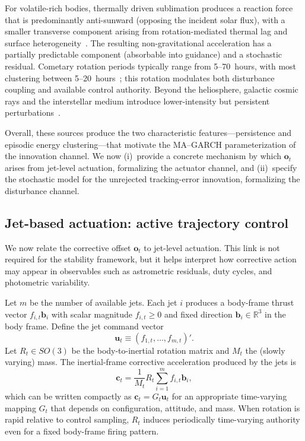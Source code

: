 \documentclass{article}
\begin{document}
For volatile-rich bodies, thermally driven sublimation produces a reaction force that is predominantly anti-sunward (opposing the incident solar flux), with a smaller transverse component arising from rotation-mediated thermal lag and surface heterogeneity~\cite{mumma2011composition}. The resulting non-gravitational acceleration has a partially predictable component (absorbable into guidance) and a stochastic residual. Cometary rotation periods typically range from 5--70~hours, with most clustering between 5--20~hours~\cite{Kokotanekova2017Rotation,simon2019comet}; this rotation modulates both disturbance coupling and available control authority. Beyond the heliosphere, galactic cosmic rays and the interstellar medium introduce lower-intensity but persistent perturbations~\cite{jokipii1998particle}. 

Overall, these sources produce the two characteristic features---persistence and episodic energy clustering---that motivate the MA--GARCH parameterization of the innovation channel. We now (i)~provide a concrete mechanism by which $\mathbf{o}_t$ arises from jet-level actuation, formalizing the actuator channel, and (ii)~specify the stochastic model for the unrejected tracking-error innovation, formalizing the disturbance channel.



\subsection{Jet-based actuation: active trajectory control}
\label{sec:jets}

We now relate the corrective offset $\mathbf{o}_t$ to jet-level actuation. This link is not required for the stability framework, but it helps interpret how corrective action may appear in observables such as astrometric residuals, duty cycles, and photometric variability.

Let $m$ be the number of available jets. Each jet $i$ produces a body-frame thrust vector
$f_{i,t}\mathbf{b}_i$ with scalar magnitude $f_{i,t}\ge 0$ and fixed direction $\mathbf{b}_i\in\mathbb{R}^3$
in the body frame. Define the jet command vector
\begin{equation}
\mathbf{u}_t \equiv (f_{1,t},\dots,f_{m,t})'.
\end{equation}
Let $R_t\in SO(3)$ be the body-to-inertial rotation matrix and $M_t$ the (slowly varying) mass.
The inertial-frame corrective acceleration produced by the jets is
\begin{equation}
\mathbf{c}_t = \frac{1}{M_t} R_t \sum_{i=1}^m f_{i,t}\mathbf{b}_i,
\label{eq:c_general}
\end{equation}
which can be written compactly as $\mathbf{c}_t = G_t \mathbf{u}_t$ for an appropriate time-varying mapping $G_t$
that depends on configuration, attitude, and mass. When rotation is rapid relative to control sampling, $R_t$ induces
periodically time-varying authority even for a fixed body-frame firing pattern.
\end{document}
